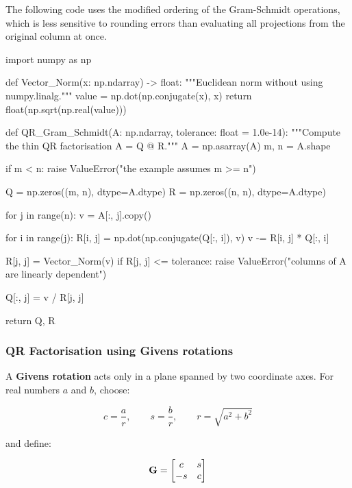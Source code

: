 The following code uses the modified ordering of the Gram-Schmidt operations,
which is less sensitive to rounding errors than evaluating all projections from
the original column at once.

\begin{python}
import numpy as np


def Vector_Norm(x: np.ndarray) -> float:
    """Euclidean norm without using numpy.linalg."""
    value = np.dot(np.conjugate(x), x)
    return float(np.sqrt(np.real(value)))


def QR_Gram_Schmidt(A: np.ndarray,
                    tolerance: float = 1.0e-14):
    """Compute the thin QR factorisation A = Q @ R."""
    A = np.asarray(A)
    m, n = A.shape

    if m < n:
        raise ValueError("the example assumes m >= n")

    Q = np.zeros((m, n), dtype=A.dtype)
    R = np.zeros((n, n), dtype=A.dtype)

    for j in range(n):
        v = A[:, j].copy()

        for i in range(j):
            R[i, j] = np.dot(np.conjugate(Q[:, i]), v)
            v -= R[i, j] * Q[:, i]

        R[j, j] = Vector_Norm(v)
        if R[j, j] <= tolerance:
            raise ValueError("columns of A are linearly dependent")

        Q[:, j] = v / R[j, j]

    return Q, R
\end{python}

\subsubsection{QR Factorisation using Givens rotations}

A \textbf{Givens rotation} acts only in a plane spanned by two coordinate axes.
For real numbers $ a $ and $ b $, choose:

\begin{equation}
    c=\frac{a}{r},\qquad s=\frac{b}{r},\qquad
    r=\sqrt{a^2+b^2}
\end{equation}

and define:

\begin{equation}
    \mathbf{G}=
    \begin{bmatrix}
        c & s \\
        -s & c
    \end{bmatrix}
\end{equation}


